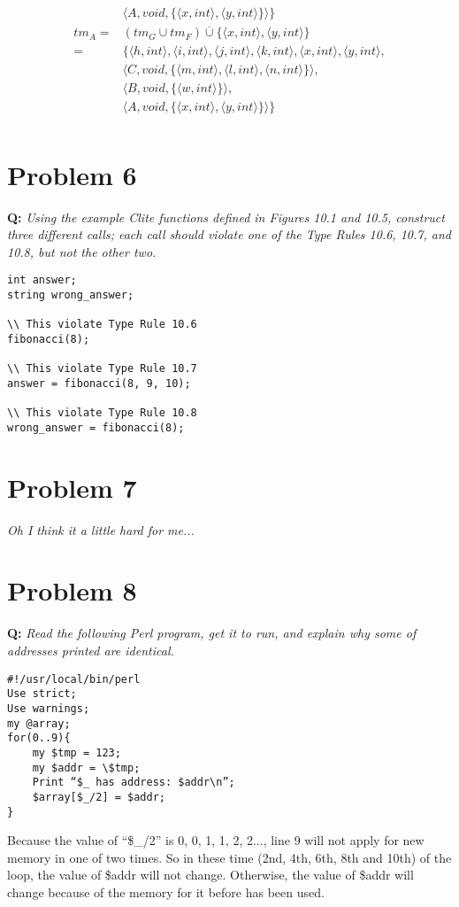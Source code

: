 \documentclass{article}
\begin{document}
\begin{align*}
       &\langle A, void, \{\langle x, int\rangle , \langle y, int\rangle \}\rangle \} \\
tm_A = &(tm_G \cup tm_F) \overline{\cup} \{\langle x, int\rangle , \langle y, int\rangle \} \\
     = &\{\langle h, int\rangle , \langle i, int\rangle , \langle j, int\rangle , \langle k, int\rangle , \langle x, int\rangle , \langle y, int\rangle , \\
       &\langle C, void, \{\langle m, int\rangle , \langle l, int\rangle , \langle n, int\rangle \}\rangle , \\
       &\langle B, void, \{\langle w, int\rangle \}\rangle , \\
       &\langle A, void, \{\langle x, int\rangle , \langle y, int\rangle \}\rangle \} \\
\end{align*}

\section*{Problem 6}
\textbf{Q:} \textit{Using the example Clite functions defined in Figures 10.1 and 10.5, construct three different calls; each call should violate one of the Type Rules 10.6, 10.7, and 10.8, but not the other two.}

\begin{lstlisting}
int answer;
string wrong_answer;

\\ This violate Type Rule 10.6
fibonacci(8);

\\ This violate Type Rule 10.7
answer = fibonacci(8, 9, 10);

\\ This violate Type Rule 10.8
wrong_answer = fibonacci(8);
\end{lstlisting}

\section*{Problem 7}
\textit{Oh I think it a little hard for me...}

\section*{Problem 8}
\textbf{Q:} \textit{Read the following Perl program, get it to run, and explain why some of addresses printed are identical.}

\begin{lstlisting}
#!/usr/local/bin/perl
Use strict;
Use warnings;
my @array;
for(0..9){
    my $tmp = 123;
    my $addr = \$tmp;
    Print “$_ has address: $addr\n”;
    $array[$_/2] = $addr;
}
\end{lstlisting}

Because the value of ``\$\_/2'' is 0, 0, 1, 1, 2, 2..., line 9 will not apply for new memory in one of two times. So in these time (2nd, 4th, 6th, 8th and 10th) of the loop, the value of \$addr will not change. Otherwise, the value of \$addr will change because of the memory for it before has been used.
\end{document}
